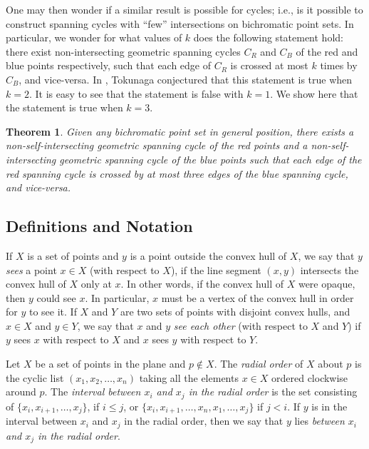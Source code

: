 \documentclass[12pt]{article}
\newtheorem{theorem}{Theorem}
\theoremstyle{definition}
\begin{document}
One may then wonder if a similar result is possible for cycles; i.e., is it possible to construct spanning cycles with ``few'' intersections on bichromatic point sets. In particular, we wonder for what values of $k$ does the
following statement hold: there exist non-intersecting geometric spanning
cycles $C_R$ and $C_B$ of the red and blue points respectively, such that each
edge of $C_R$ is crossed at most $k$ times by $C_B$, and vice-versa.
In \cite{tokunaga1996intersection}, Tokunaga conjectured that this statement is
true when $k=2$.
It is easy to see that the statement is false with $k=1$.
We show here that the statement is true when $k=3$.

\begin{theorem}
\label{thm:main}
Given any bichromatic point set in general position, there exists a non-self-intersecting geometric spanning cycle of the red points and a
non-self-intersecting geometric spanning cycle of the blue points such that
each edge of the red spanning cycle is crossed by at most three edges of the blue spanning cycle, and vice-versa.
\end{theorem}

\subsection{Definitions and Notation}
If $X$ is a set of points and $y$ is a point outside the convex hull of $X$, we say that $y$ \emph{sees} a point $x\in X$ (with respect to $X$), if the line segment $(x,y)$ intersects the convex hull of $X$ only at $x$.
In other words, if the convex hull of $X$ were opaque, then $y$ could see $x$.
In particular, $x$ must be a vertex of the convex hull in order for $y$ to see it.
If $X$ and $Y$ are two sets of points with disjoint convex hulls, and $x\in X$ and $y\in Y$, we say that $x$ and $y$ \emph{see each other} (with respect to $X$ and $Y$) if $y$ sees $x$ with respect to $X$ and $x$ sees $y$ with respect to $Y$.

Let $X$ be a set of points in the plane and $p\not\in X$.
The \emph{radial order} of $X$ about $p$ is the cyclic  list $(x_1, x_2, \dots, x_n)$ taking all the
elements $x\in X$ ordered clockwise around $p$.
The \emph{interval between $x_i$ and $x_j$ in the radial order} is the set consisting of $\{x_i,x_{i+1},\ldots,x_j\}$, if $i\leq j$, or $\{x_i,x_{i+1},\ldots,x_n,x_1,\ldots,x_j\}$ if $j<i$.
If $y$ is in the interval between $x_i$ and $x_j$ in the radial order, then we say that $y$ lies \emph{between $x_i$ and $x_j$ in the radial order}.
\end{document}
